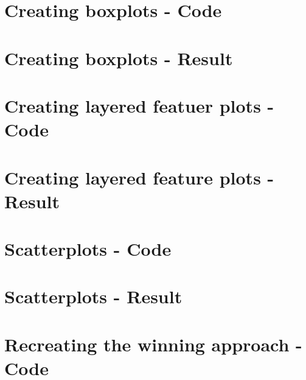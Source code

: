 \section{Creating boxplots - Code} %
\label{app:source-boxplots}

\section{Creating boxplots - Result} %
\label{app:result-boxplots}

\section{Creating layered featuer plots - Code} %
\label{app:source-layered-feature-plots}


\section{Creating layered feature plots - Result} %
\label{app:result-layered-feature-plots}


\section{Scatterplots - Code} %
\label{app:source-scatterplots}

\section{Scatterplots - Result} %
\label{app:result-scatterplots}


\section{Recreating the winning approach - Code} %
\label{app:source-recreate-winner}
